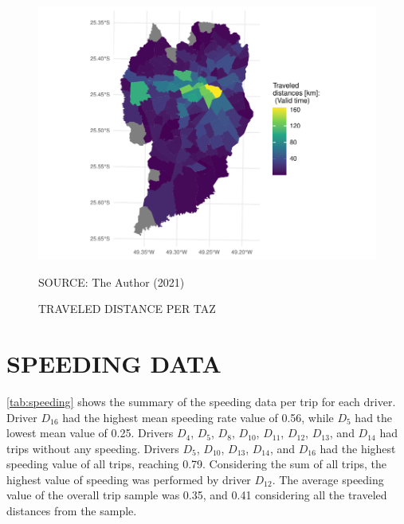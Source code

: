 
\begin{figure}[!htbp]
    \centering\footnotesize
    \captionsetup{font=footnotesize}
    \caption{TRAVELED DISTANCE PER TAZ}
    \includegraphics{fig/taz_travel.pdf}
    \label{fig:taz_travel}
    \par SOURCE: The Author (2021)
\end{figure}

\section{SPEEDING DATA} \label{sec:spr}


\autoref{tab:speeding} shows the summary of the speeding data per trip for each driver. Driver $D_{16}$ had the highest mean speeding rate value of 0.56, while $D_5$ had the lowest mean value of 0.25. Drivers $D_4$, $D_5$, $D_8$, $D_{10}$, $D_{11}$, $D_{12}$, $D_{13}$, and $D_{14}$ had trips without any speeding. Drivers $D_5$, $D_{10}$, $D_{13}$, $D_{14}$, and $D_{16}$ had the highest speeding value of all trips, reaching 0.79. Considering the sum of all trips, the highest value of speeding was performed by driver $D_{12}$. The average speeding value of the overall trip sample was 0.35, and 0.41 considering all the traveled distances from the sample.  

